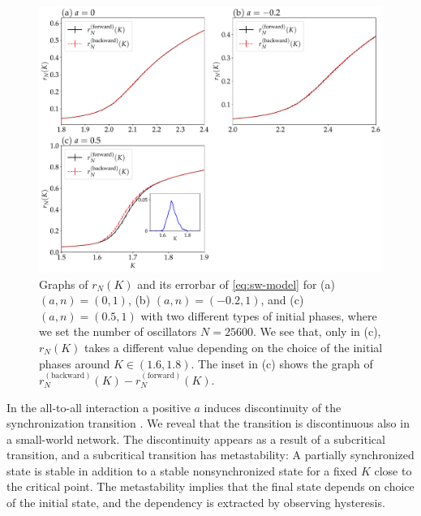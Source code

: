 \begin{figure}[t]
  \begin{center}
    \includegraphics[width=\textwidth]{figs/check_hysteresis.pdf}
    \caption{
      Graphs of $r_{N}(K)$ and its errorbar of \eqref{eq:sw-model}
      for (a) $(a,n)=(0,1)$, (b) $(a,n)=(-0.2,1)$, and (c) $(a,n)=(0.5,1)$
      with two different types of initial phases,
      where we set the number of oscillators $N=25600$.
      We see that, only in (c), $r_{N}(K)$ takes a different value depending on the choice of the initial phases
      around $K\in(1.6,1.8)$.
      The inset in (c) shows the graph of $r_{N}^{(\mathrm{backward})}(K)-r_{N}^{(\mathrm{forward})}(K)$.
    }
    \label{fig:hysteresis}
  \end{center}
\end{figure}

In the all-to-all interaction
a positive $a$ induces discontinuity of the synchronization transition
\cite{chiba2011}.
We reveal that the transition is discontinuous
also in a small-world network.
The discontinuity appears as a result of a subcritical transition,
and a subcritical transition has metastability:
A partially synchronized state is stable in addition to
a stable nonsynchronized state for a fixed $K$ close to the critical point.
The metastability implies that the final state depends on
choice of the initial state,
and the dependency is extracted by observing hysteresis.

